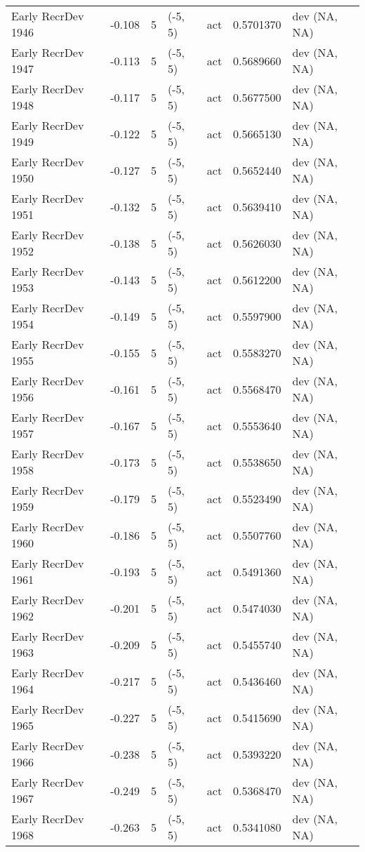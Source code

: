 \documentclass[11pt,
  english,
  letterpaper,
]{article}
\begin{document}
\begin{landscape}
\begin{longtable}[t]{>{\raggedright\arraybackslash}p{6cm}lllll>{\raggedright\arraybackslash}p{4cm}}
Early RecrDev 1946 & -0.108 & 5 & (-5, 5) & act & 0.5701370 & dev (NA, NA)\\
Early RecrDev 1947 & -0.113 & 5 & (-5, 5) & act & 0.5689660 & dev (NA, NA)\\
Early RecrDev 1948 & -0.117 & 5 & (-5, 5) & act & 0.5677500 & dev (NA, NA)\\
Early RecrDev 1949 & -0.122 & 5 & (-5, 5) & act & 0.5665130 & dev (NA, NA)\\
Early RecrDev 1950 & -0.127 & 5 & (-5, 5) & act & 0.5652440 & dev (NA, NA)\\
Early RecrDev 1951 & -0.132 & 5 & (-5, 5) & act & 0.5639410 & dev (NA, NA)\\
Early RecrDev 1952 & -0.138 & 5 & (-5, 5) & act & 0.5626030 & dev (NA, NA)\\
Early RecrDev 1953 & -0.143 & 5 & (-5, 5) & act & 0.5612200 & dev (NA, NA)\\
Early RecrDev 1954 & -0.149 & 5 & (-5, 5) & act & 0.5597900 & dev (NA, NA)\\
Early RecrDev 1955 & -0.155 & 5 & (-5, 5) & act & 0.5583270 & dev (NA, NA)\\
Early RecrDev 1956 & -0.161 & 5 & (-5, 5) & act & 0.5568470 & dev (NA, NA)\\
Early RecrDev 1957 & -0.167 & 5 & (-5, 5) & act & 0.5553640 & dev (NA, NA)\\
Early RecrDev 1958 & -0.173 & 5 & (-5, 5) & act & 0.5538650 & dev (NA, NA)\\
Early RecrDev 1959 & -0.179 & 5 & (-5, 5) & act & 0.5523490 & dev (NA, NA)\\
Early RecrDev 1960 & -0.186 & 5 & (-5, 5) & act & 0.5507760 & dev (NA, NA)\\
Early RecrDev 1961 & -0.193 & 5 & (-5, 5) & act & 0.5491360 & dev (NA, NA)\\
Early RecrDev 1962 & -0.201 & 5 & (-5, 5) & act & 0.5474030 & dev (NA, NA)\\
Early RecrDev 1963 & -0.209 & 5 & (-5, 5) & act & 0.5455740 & dev (NA, NA)\\
Early RecrDev 1964 & -0.217 & 5 & (-5, 5) & act & 0.5436460 & dev (NA, NA)\\
Early RecrDev 1965 & -0.227 & 5 & (-5, 5) & act & 0.5415690 & dev (NA, NA)\\
Early RecrDev 1966 & -0.238 & 5 & (-5, 5) & act & 0.5393220 & dev (NA, NA)\\
Early RecrDev 1967 & -0.249 & 5 & (-5, 5) & act & 0.5368470 & dev (NA, NA)\\
Early RecrDev 1968 & -0.263 & 5 & (-5, 5) & act & 0.5341080 & dev (NA, NA)\\

\end{longtable}
\end{landscape}
\end{document}
